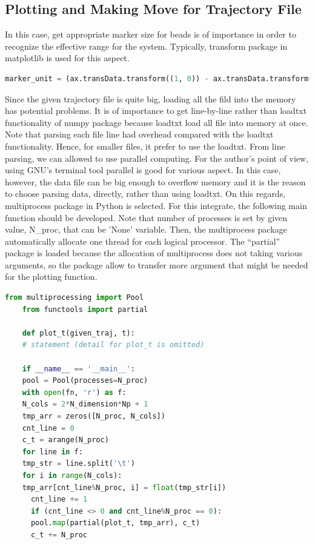 \message{ !name(brief_Brownian_dynamics.tex)}\documentclass[10pt, a4paper]{report}
\begin{document}
\begin{appendices}
  \section{Plotting and Making Move for Trajectory File}
  In this case, get appropriate marker size for beads is of importance in order to recognize the effective range for the system. Typically, transform package in matplotlib is used for this aspect.
  \begin{lstlisting}[language=Python,frame=single,numbers=none]
    marker_unit = (ax.transData.transform((1, 0)) - ax.transData.transform((0, 0)))[0]
  \end{lstlisting}

  Since the given trajectory file is quite big, loading all the fild into the memory has potential problems. It is of importance to get line-by-line rather than loadtxt functionality of numpy package because loadtxt load all file into memory at once. Note that parsing each file line had overhead compared with the loadtxt functionality. Hence, for smaller files, it prefer to use the loadtxt. From line parsing, we can allowed to use parallel computing. For the author's point of view, using GNU's terminal tool parallel is good for various aspect. In this case, however, the data file can be big enough to overflow memory and it is the reason to choose parsing data, directly, rather than using loadtxt. On this regards, multiprocess package in Python is selected. For this integrate, the following main function should be developed. Note that number of processes is set by given value, N{\_}proc, that can be 'None' variable. Then, the multiprocess package automatically allocate one thread for each logical processor. The ``partial'' package is loaded because the allocation of multiprocess does not taking various arguments, so the package allow to transfer more argument that might be needed for the plotting function.

  \begin{lstlisting}[language=Python,frame=single]
    from multiprocessing import Pool
    from functools import partial

    def plot_t(given_traj, t):
    # statement (detail for plot_t is omitted)

    if __name__ == '__main__':
    pool = Pool(processes=N_proc)
    with open(fn, 'r') as f:
    N_cols = 2*N_dimension*Np + 1
    tmp_arr = zeros([N_proc, N_cols])
    cnt_line = 0
    c_t = arange(N_proc)
    for line in f:
    tmp_str = line.split('\t')
    for i in range(N_cols):
    tmp_arr[cnt_line%N_proc, i] = float(tmp_str[i])
      cnt_line += 1
      if (cnt_line <> 0 and cnt_line%N_proc == 0):
      pool.map(partial(plot_t, tmp_arr), c_t)
      c_t += N_proc
  \end{lstlisting}


\end{appendices}
\end{document}
